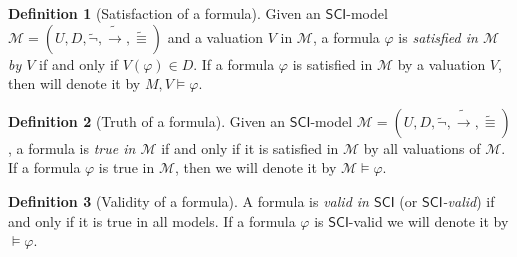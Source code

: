 \documentclass{article}
\theoremstyle{definition}
\newtheorem{definition}{Definition}[section]
\theoremstyle{definition}
\theoremstyle{definition}
\newcommand*{\id}{\equiv}
\newcommand*{\ra}{\rightarrow}
\newcommand{\SCI}{$\mathsf{SCI}$\xspace}
\begin{document}
\begin{definition}[Satisfaction of a formula]
    Given an \SCI-model $\mathcal{M} = (U, D, \tilde{\lnot}, \tilde{\ra}, \tilde{\id})$ and a valuation $V$ in $\mathcal{M}$, a formula $\varphi$ is \emph{satisfied in $\mathcal{M}$ by $V$} if and only if $V(\varphi) \in D$. If a formula $\varphi$ is satisfied in $\mathcal{M}$ by a valuation $V$, then will denote it by $M, V \models \varphi$.
\end{definition}

\begin{definition}[Truth of a formula]
    Given an \SCI-model $\mathcal{M} = (U, D, \tilde{\lnot}, \tilde{\ra}, \tilde{\id})$, a formula is \emph{true in $\mathcal{M}$} if and only if it is satisfied in $\mathcal{M}$ by all valuations of $\mathcal{M}$. If a formula $\varphi$ is true in $\mathcal{M}$, then we will denote it by $\mathcal{M} \models \varphi$.
\end{definition}

\begin{definition}[Validity of a formula]
    A formula is \emph{valid in \SCI} (or \emph{\SCI-valid}) if and only if it is true in all models. If a formula $\varphi$ is \SCI-valid we will denote it by $ \models \varphi$.
\end{definition}
\end{document}
